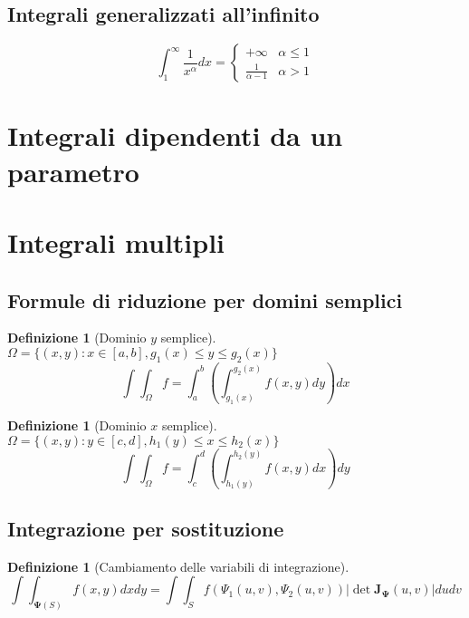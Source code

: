 \documentclass[a4paper,12pt]{report}
\theoremstyle{mystyle}
\newtheorem{definition}[theorem]{Definizione}
\begin{document}
\subsection{Integrali generalizzati all'infinito}
\[\int_1^\infty \frac{1}{x^\alpha}dx = \begin{cases}+\infty & \alpha \leq 1 \\ \frac{1}{\alpha - 1} & \alpha > 1\end{cases}\]



\newpage    %
\section{Integrali dipendenti da un parametro}

\section{Integrali multipli}
\subsection{Formule di riduzione per domini semplici}
\begin{definition}[Dominio \(y\) semplice]
    \(\Omega = \{(x,y): x \in [a,b], g_1(x) \leq y \leq g_2(x)\}\)
    \[
        \int \int _\Omega f = \int_a^b \left(\int_{g_1(x)}^{g_2(x)} f(x,y) dy \right)dx
    \]
\end{definition}

\begin{definition}[Dominio \(x\) semplice]
    \(\Omega = \{(x,y) : y \in [c,d], h_1(y) \leq x \leq h_2(x)\}\)
    \[
    \int \int _\Omega f = \int_c^d \left (\int_{h_1(y)}^{h_2(y)} f(x,y) dx \right)dy
    \]    
\end{definition}


\subsection{Integrazione per sostituzione}
\begin{definition}[Cambiamento delle variabili di integrazione]
    \[
        \int \int _{\mathbf\Psi (S)} f (x,y) dx dy = \int \int _S f (\Psi_1(u,v), \Psi_2(u,v)) \lvert \det \mathbf{J_{\Psi}} (u,v)\rvert du dv
    \]
\end{definition}
\end{document}
